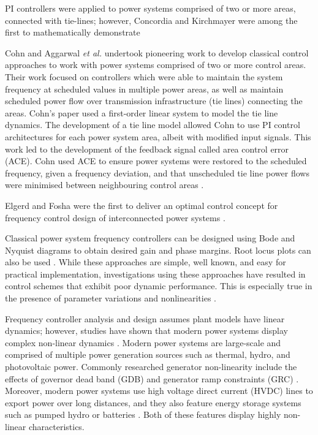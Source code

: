 PI controllers were applied to power systems comprised of two or more areas, connected with tie-lines; however, Concordia and Kirchmayer \cite{} were among the first to mathematically demonstrate 

Cohn \cite{Cohn1971} and Aggarwal \textit{et al.} \cite{Aggarwal1968, Aggarwal1968a} undertook pioneering work to develop classical control approaches to work with power systems comprised of two or more control areas. Their work focused on controllers which were able to maintain the system frequency at scheduled values in multiple power areas, as well as maintain scheduled power flow over transmission infrastructure (tie lines) connecting the areas. Cohn's paper used a first-order linear system to model the tie line dynamics. The development of a tie line model allowed Cohn to use PI control architectures for each power system area, albeit with modified input signals. This work led to the development of the feedback signal called area control error (ACE). Cohn used ACE to ensure power systems were restored to the scheduled frequency, given a frequency deviation, and that unscheduled tie line power flows were minimised between neighbouring control areas \cite{Cohn1956}.

Elgerd and Fosha were the first to deliver an optimal control concept for frequency control design of interconnected power systems \cite{Elgerd1970}. 

Classical power system frequency controllers can be designed using Bode and Nyquist diagrams to obtain desired gain and phase margins. Root locus plots can also be used \cite{Ogat2010}. While these approaches are simple, well known, and easy for practical implementation, investigations using these approaches have resulted in control schemes that exhibit poor dynamic performance. This is especially true in the presence of parameter variations and nonlinearities \cite{Kundur1994, Elgerd1970, Bechert1977}.

Frequency controller analysis and design assumes plant models have linear dynamics; however, studies have shown that modern power systems display complex non-linear dynamics \cite{Concordia1957, Kwatny1975, Elgerd1994, Morsali2014}. Modern power systems are large-scale and comprised of multiple power generation sources such as thermal, hydro, and photovoltaic power. Commonly researched generator non-linearity include the effects of governor dead band (GDB) \cite{Concordia1957} and generator ramp constraints (GRC) \cite{Kwatny1975, Elgerd1994}. Moreover, modern power systems use high voltage direct current (HVDC) lines to export power over long distances, and they also feature energy storage systems such as pumped hydro or batteries \cite{Bevrani2011, Glover2012, Kothari2011, Kundur1994}. Both of these features display highly non-linear characteristics.

